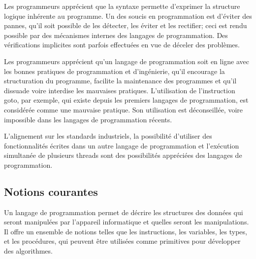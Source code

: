 \documentclass[a4paper,12pt]{article}
\begin{document}
Les programmeurs apprécient que la syntaxe permette d'exprimer la structure logique inhérente au programme. Un des soucis en programmation est d'éviter des pannes, qu'il soit possible de les détecter, les éviter et les rectifier; ceci est rendu possible par des mécanismes internes des langages de programmation. Des vérifications implicites sont parfois effectuées en vue de déceler des problèmes\cite{itl}.

Les programmeurs apprécient qu'un langage de programmation soit en ligne avec les bonnes pratiques de programmation et d'ingénierie, qu'il encourage la structuration du programme, facilite la maintenance des programmes et qu'il dissuade voire interdise les mauvaises pratiques\cite{itl}. L'utilisation de l'instruction goto, par exemple, qui existe depuis les premiers langages de programmation, est considérée comme une mauvaise pratique. Son utilisation est déconseillée, voire impossible dans les langages de programmation récents\cite{barlow}.

L'alignement sur les standards industriels, la possibilité d'utiliser des fonctionnalités écrites dans un autre langage de programmation et l'exécution simultanée de plusieurs threads sont des possibilités appréciées des langages de programmation\cite{itl}.

\subsection{Notions courantes}

Un langage de programmation permet de décrire les structures des données qui seront manipulées par l'appareil informatique et quelles seront les manipulations. Il offre un ensemble de notions telles que les instructions, les variables, les types, et les procédures, qui peuvent être utilisées comme primitives pour développer des algorithmes\cite{thakare}.
\end{document}
